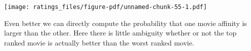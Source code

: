 \documentclass[
  letterpaper,
  DIV=11,
  numbers=noendperiod]{scrartcl}
\newenvironment{Shaded}{\begin{snugshade}}{\end{snugshade}}
\newcommand{\AttributeTok}[1]{\textcolor[rgb]{0.40,0.45,0.13}{#1}}
\newcommand{\ConstantTok}[1]{\textcolor[rgb]{0.56,0.35,0.01}{#1}}
\newcommand{\DecValTok}[1]{\textcolor[rgb]{0.68,0.00,0.00}{#1}}
\newcommand{\FloatTok}[1]{\textcolor[rgb]{0.68,0.00,0.00}{#1}}
\newcommand{\FunctionTok}[1]{\textcolor[rgb]{0.28,0.35,0.67}{#1}}
\newcommand{\NormalTok}[1]{\textcolor[rgb]{0.00,0.23,0.31}{#1}}
\newcommand{\OtherTok}[1]{\textcolor[rgb]{0.00,0.23,0.31}{#1}}
\newcommand{\SpecialCharTok}[1]{\textcolor[rgb]{0.37,0.37,0.37}{#1}}
\newcommand{\StringTok}[1]{\textcolor[rgb]{0.13,0.47,0.30}{#1}}
\begin{document}
\begin{Shaded}
\end{Shaded}

\texttt{[image: ratings\_files/figure-pdf/unnamed-chunk-55-1.pdf]}

Even better we can directly compute the probability that one movie
affinity is larger than the other. Here there is little ambiguity
whether or not the top ranked movie is actually better than the worst
ranked movie.
\end{document}
